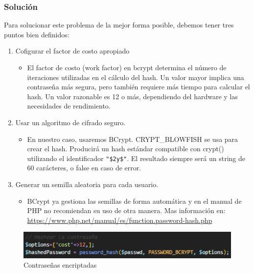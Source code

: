 \documentclass{report}
\begin{document}
                \subsubsection{Solución}
                    Para solucionar este problema de la mejor forma posible, debemos tener tres puntos bien definidos:
                    \begin{enumerate}
                        \item Cofigurar el factor de costo apropiado
                        \begin{itemize}
                            \item El factor de costo (work factor) en bcrypt determina el número de iteraciones utilizadas en el cálculo del hash. Un valor mayor implica una contraseña más segura, pero también requiere más tiempo para calcular el hash. Un valor razonable es 12 o más, dependiendo del hardware y las necesidades de rendimiento.
                        \end{itemize}
                        \item Usar un algoritmo de cifrado seguro.
                        \begin{itemize}
                            \item En nuestro caso, usaremos BCrypt. CRYPT\_BLOWFISH se usa para crear el hash. Producirá un hash estándar compatible con crypt() utilizando el identificador \texttt{"\$2y\$"}. El resultado siempre será un string de 60 carácteres, o false en caso de error.
                        \end{itemize}
                        \item Generar un semilla aleatoria para cada usuario.
                        \begin{itemize}
                            \item BCrypt ya gestiona las semillas de forma automática y en el manual de PHP no recomiendan su uso de otra manera. Mas información en: \url{https://www.php.net/manual/es/function.password-hash.php}
                        \end{itemize}
                    \end{enumerate}
                    \begin{figure}[H]
                        \centering
                        \includegraphics[width=\textwidth]{./img/vulnerabilidades/3.2/2.2.png}
                        \caption{Contraseñas encriptadas}
                    \end{figure}
            \clearpage
\end{document}
